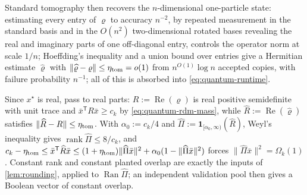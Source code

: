 \documentclass[11pt]{article}
\theoremstyle{definition}
\theoremstyle{remark}
\newcommand{\1}{\mathbf 1}
\DeclareMathOperator{\Ran}{Ran}
\DeclareMathOperator{\rank}{rank}
\numberwithin{equation}{section}
\begin{document}
Standard tomography then recovers the $n$-dimensional one-particle
state: estimating every entry of $\varrho$ to accuracy $n^{-2}$, by
repeated measurement in the standard basis and in the $O(n^2)$
two-dimensional rotated bases revealing the real and imaginary parts of
one off-diagonal entry, controls the operator norm at scale $1/n$;
Hoeffding's inequality and a union bound over entries give a Hermitian
estimate $\widehat\varrho$ with
$\|\widehat\varrho-\varrho\|\le\eta_{\rm tom}=o(1)$ from
$n^{O(1)}\log n$ accepted copies, with failure probability $n^{-1}$;
all of this is absorbed into \cref{eq:quantum-runtime}.

Since $x^\star$ is real, pass to real parts:
$R:=\operatorname{Re}(\varrho)$ is real positive semidefinite with
unit trace and $\bar x^{\mathsf T}R\bar x\ge c_k$ by
\cref{eq:quantum-rdm-mass}, while
$\widehat R:=\operatorname{Re}(\widehat\varrho)$ satisfies
$\|\widehat R-R\|\le\eta_{\rm tom}$.  With $\alpha_0:=c_k/4$ and
$\widehat\Pi:=\1_{[\alpha_0,\infty)}(\widehat R)$, Weyl's inequality
gives $\rank\widehat\Pi\le8/c_k$, and
$c_k-\eta_{\rm tom}\le\bar x^{\mathsf T}\widehat R\bar x
\le(1+\eta_{\rm tom})\|\widehat\Pi\bar x\|^2
+\alpha_0(1-\|\widehat\Pi\bar x\|^2)$ forces
$\|\widehat\Pi\bar x\|^2=\Omega_k(1)$.  Constant rank and constant
planted overlap are exactly the inputs of \cref{lem:rounding}, applied
to $\Ran\widehat\Pi$; an independent validation pool then gives a
Boolean vector of constant overlap.
\end{document}
